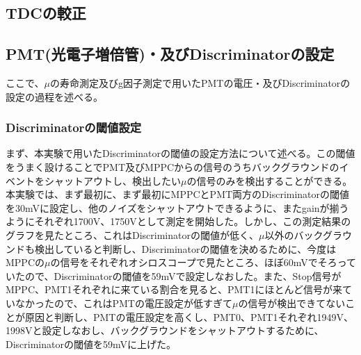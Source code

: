 \subsection{TDCの較正}

\subsection{PMT(光電子増倍管)・及びDiscriminatorの設定}
ここで、$\mu$の寿命測定及びg因子測定で用いたPMTの電圧・及びDiscriminatorの設定の過程を述べる。
\subsubsection{Discriminatorの閾値設定}
まず、本実験で用いたDiscriminatorの閾値の設定方法について述べる。この閾値をうまく設けることでPMT及びMPPCからの信号のうちバックグラウンドのイベントをシャットアウトし、検出したい$\mu$の信号のみを検出することができる。
本実験では、まず最初に、まず最初にMPPCとPMT両方のDiscriminatorの閾値を30mVに設定し、他のノイズをシャットアウトできるように、またgainが揃うようにそれぞれ1700V、1750Vとして測定を開始した。しかし、この測定結果のグラフを見たところ、これはDiscriminatorの閾値が低く、$\mu$以外のバックグラウンドも検出していると判断し、Discriminatorの閾値を決めるために、今度はMPPCの$\mu$の信号をそれぞれオシロスコープで見たところ、ほぼ60mVでそろっていたので、Discriminatorの閾値を59mVで設定しなおした。また、Stop信号がMPPC、PMT1それぞれに来ている割合を見ると、PMT1にほとんど信号が来ていなかったので、これはPMTの電圧設定が低すぎて$\mu$の信号が検出できてないことが原因と判断し、PMTの電圧設定を高くし、PMT0、PMT1それぞれ1949V、1998Vと設定しなおし、バックグラウンドをシャットアウトするために、Discriminatorの閾値を59mVに上げた。
